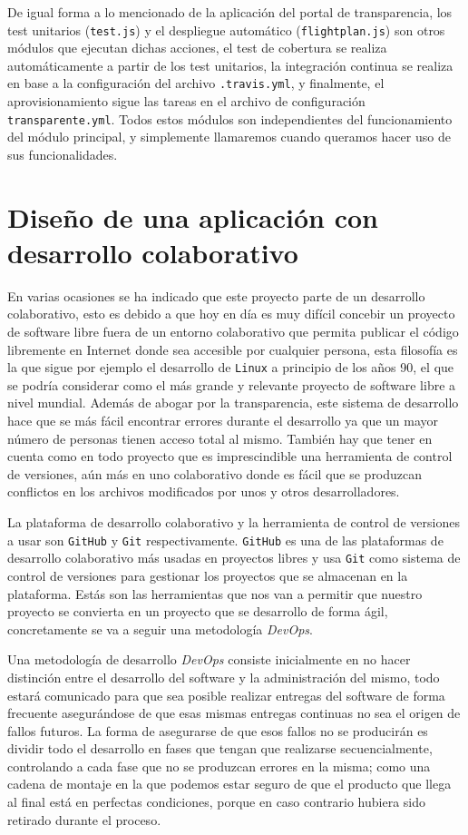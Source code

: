 \bigskip
De igual forma a lo mencionado de la aplicación del portal de transparencia, los test unitarios ({\tt test.js}) y el despliegue automático ({\tt flightplan.js}) son otros módulos que ejecutan dichas acciones, el test de cobertura se realiza automáticamente a partir de los test unitarios, la integración continua se realiza en base a la configuración del archivo {\tt .travis.yml}, y finalmente, el aprovisionamiento sigue las tareas en el archivo de configuración {\tt transparente.yml}. Todos estos módulos son independientes del funcionamiento del módulo principal, y simplemente llamaremos cuando queramos hacer uso de sus funcionalidades.

\newpage
\section{Diseño de una aplicación con desarrollo colaborativo}

En varias ocasiones se ha indicado que este proyecto parte de un desarrollo colaborativo, esto es debido a que hoy en día es muy difícil concebir un proyecto de software libre fuera de un entorno colaborativo que permita publicar el código libremente en Internet donde sea accesible por cualquier persona, esta filosofía es la que sigue por ejemplo el desarrollo de {\tt Linux} a principio de los años 90, el que se podría considerar como el más grande y relevante proyecto de software libre a nivel mundial. Además de abogar por la transparencia, este sistema de desarrollo hace que se más fácil encontrar errores durante el desarrollo ya que un mayor número de personas tienen acceso total al mismo. También hay que tener en cuenta como en todo proyecto que es imprescindible una herramienta de control de versiones, aún más en uno colaborativo donde es fácil que se produzcan conflictos en los archivos modificados por unos y otros desarrolladores.

\bigskip
La plataforma de desarrollo colaborativo y la herramienta de control de versiones a usar son {\tt GitHub} y {\tt Git} respectivamente. {\tt GitHub} es una de las plataformas de desarrollo colaborativo más usadas en proyectos libres y usa {\tt Git} como sistema de control de versiones para gestionar los proyectos que se almacenan en la plataforma. Estás son las herramientas que nos van a permitir que nuestro proyecto se convierta en un proyecto que se desarrollo de forma ágil,  concretamente se va a seguir una metodología \textit{DevOps}.

\bigskip
Una metodología de desarrollo \textit{DevOps} consiste inicialmente en no hacer distinción entre el desarrollo del software y la administración del mismo, todo estará comunicado para que sea posible realizar entregas del software de forma frecuente asegurándose de que esas mismas entregas continuas no sea el origen de fallos futuros. La forma de asegurarse de que esos fallos no se producirán es dividir todo el desarrollo en fases que tengan que realizarse secuencialmente, controlando a cada fase que no se produzcan errores en la misma; como una cadena de montaje en la que podemos estar seguro de que el producto que llega al final está en perfectas condiciones, porque en caso contrario hubiera sido retirado durante el proceso.


